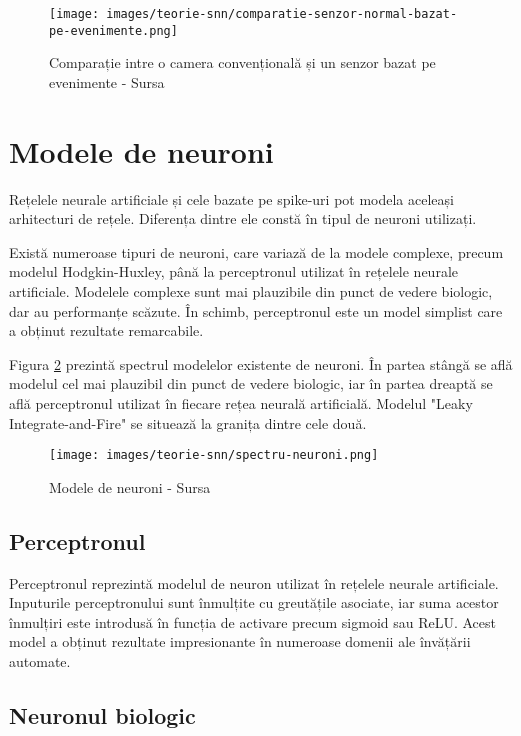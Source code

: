 \begin{figure}
    \centering
    \texttt{[image: images/teorie-snn/comparatie-senzor-normal-bazat-pe-evenimente.png]}
    \caption{Comparație intre o camera convențională și un senzor bazat pe evenimente - Sursa \cite{comparatieSenzori}}
    \label{fig:camera}
\end{figure}


\section{Modele de neuroni}

Rețelele neurale artificiale și cele bazate pe spike-uri pot modela aceleași arhitecturi de rețele. Diferența dintre ele constă în tipul de neuroni utilizați.

Există numeroase tipuri de neuroni, care variază de la modele complexe, precum modelul Hodgkin-Huxley, până la perceptronul utilizat în rețelele neurale artificiale. Modelele complexe sunt mai plauzibile din punct de vedere biologic, dar au performanțe scăzute. În schimb, perceptronul este un model simplist care a obținut rezultate remarcabile.

Figura \ref{fig:tipuriNeuroni} prezintă spectrul modelelor existente de neuroni. În partea stângă se află modelul cel mai plauzibil din punct de vedere biologic, iar în partea dreaptă se află perceptronul utilizat în fiecare rețea neurală artificială. Modelul "Leaky Integrate-and-Fire" se situează la granița dintre cele două. 

\begin{figure}
    \centering
    \texttt{[image: images/teorie-snn/spectru-neuroni.png]}
    \caption{Modele de neuroni - Sursa \cite{modeleNeuroni}}
    \label{fig:tipuriNeuroni}
\end{figure}

\subsection{Perceptronul}

Perceptronul reprezintă modelul de neuron utilizat în rețelele neurale artificiale. Inputurile perceptronului sunt înmulțite cu greutățile asociate, iar suma acestor înmulțiri este introdusă în funcția de activare precum sigmoid sau ReLU. Acest model a obținut rezultate impresionante în numeroase domenii ale învățării automate.

\subsection{Neuronul biologic}

